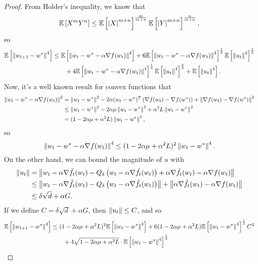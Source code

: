 \begin{proof}
From Holder's inequality, we know that
\[
  \mathbb{E}\left[ X^m Y^n \right]
  \le
  \mathbb{E}\left[ \left| X \right|^{m+n} \right]^{\frac{m}{m+n}} \mathbb{E}\left[ \left| Y \right|^{m+n} \right]^{\frac{n}{m+n}},
\]
so
\begin{align*}
  \mathbb{E}\left[  \left\| w_{t+1} - w^* \right\|^4  \right]
  &\le
  \mathbb{E}\left[  \left\| w_t - w^* - \alpha \nabla f(w_t)  \right\|^4  \right]
  +
  6 \mathbb{E}\left[  \left\| w_t - w^* - \alpha \nabla f(w_t)  \right\|^4  \right]^{\frac{1}{2}}
  \mathbb{E}\left[  \left\| u_t \right\|^4  \right]^{\frac{1}{2}}
  \\&\hspace{2em}+
  4 \mathbb{E}\left[  \left\| w_t - w^* - \alpha \nabla f(w_t)  \right\|^4  \right]^{\frac{1}{4}}
  \mathbb{E}\left[  \left\| u_t \right\|^4  \right]^{\frac{3}{4}}
  +
  \mathbb{E}\left[  \left\| u_t \right\|^4  \right].
\end{align*}
Now, it's a well known result for convex functions that
\begin{align*}
  \left\| w_t - w^* - \alpha \nabla f(w_t)  \right\|^2
  &=
  \left\| w_t - w^* \right\|^2 
  - 
  2\alpha (w_t - w^*)^T \left( \nabla f(w_t) - \nabla f(w^*) \right)
  +
  \left\|  \nabla f(w_t) - \nabla f(w^*)  \right\|^2 \\
  &\le
  \left\| w_t - w^* \right\|^2 
  - 
  2 \alpha \mu \left\| w_t - w^* \right\|^2 
  +
  \alpha^2 L \left\| w_t - w^* \right\|^2 \\
  &=
  (1 - 2 \alpha \mu + \alpha^2 L) \left\| w_t - w^* \right\|^2,
\end{align*}
so
\[
  \left\| w_t - w^* - \alpha \nabla f(w_t)  \right\|^4
  \le
  (1 - 2 \alpha \mu + \alpha^2 L)^2 \left\| w_t - w^* \right\|^4.
\]
On the other hand, we can bound the magnitude of $u$ with
\begin{align*}
  \left\|  u_t  \right\|
  &=
  \left\|  
    w_t - \alpha \nabla \tilde f_t(w_t)
    -
    Q_{\delta}\left( w_t - \alpha \nabla \tilde f_t(w_t) \right)
    +
    \alpha \nabla \tilde f_t(w_t)
    -
    \alpha \nabla f(w_t)
     \right\| \\
  &\le
  \left\|  
    w_t - \alpha \nabla \tilde f_t(w_t)
    -
    Q_{\delta}\left( w_t - \alpha \nabla \tilde f_t(w_t) \right)
   \right\|
  +
  \left\| 
    \alpha \nabla \tilde f_t(w_t)
    -
    \alpha \nabla f(w_t)
   \right\| \\
  &\le
  \delta \sqrt{d}
  +
  \alpha G.
\end{align*}
If we define $C = \delta \sqrt{d} + \alpha G$, then $\left\|  u_t  \right\| \le C$, and so
\begin{align*}
  \Exv{ \norm{w_{t+1} - w^*}^4 }
  &\le
  (1 - 2 \alpha \mu + \alpha^2 L)^2 \Exv{\norm{w_t - w^*}^4}
  +
  6 (1 - 2 \alpha \mu + \alpha^2 L) \Exv{\norm{w_t - w^*}^4}^{\frac{1}{2}}
  C^2
  \\&\hspace{2em}+
  4 \sqrt{1 - 2 \alpha \mu + \alpha^2 L} \cdot \Exv{\norm{w_t - w^*}^4}^{\frac{1}{4}}

\end{align*}
\end{proof}

